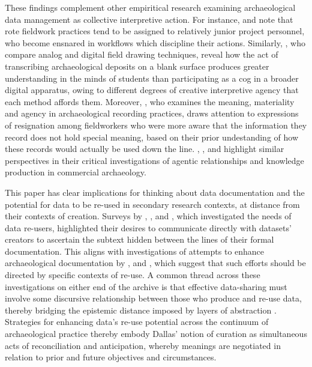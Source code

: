 \documentclass[
]{article}
\begin{document}
These findings complement other empiritical research examining
archaeological data management as collective interpretive action. For
instance, \textcite{batist2021} and \textcite{batist-alienation} note
that rote fieldwork practices tend to be assigned to relatively junior
project personnel, who become ensnared in workflows which discipline
their actions. Similarly, \textcite{morgan2018}, who compare analog and
digital field drawing techniques, reveal how the act of transcribing
archaeological deposits on a blank surface produces greater
understanding in the minds of students than participating as a cog in a
broader digital apparatus, owing to different degrees of creative
interpretive agency that each method affords them. Moreover,
\textcite{yarrow2008}, who examines the meaning, materiality and agency
in archaeological recording practices, draws attention to expressions of
resignation among fieldworkers who were more aware that the information
they record does not hold special meaning, based on their prior
undestanding of how these records would actually be used down the line.
\textcite{thorpe2012}, \textcite{zorzin2010}, \textcite{edgeworth1991}
and \textcite{watson2019} highlight similar perspectives in their
critical investigations of agentic relationships and knowledge
production in commercial archaeology.

This paper has clear implications for thinking about data documentation
and the potential for data to be re-used in secondary research contexts,
at distance from their contexts of creation. Surveys by
\textcite[299-301]{faniel2012}, \textcite[676-677]{atici2013},
\textcite[90-91]{kansa2013} and \textcite[213]{chapman2016}, which
investigated the needs of data re-users, highlighted their desires to
communicate directly with datasets' creators to ascertain the subtext
hidden between the lines of their formal documentation. This aligns with
investigations of attempts to enhance archaeological documentation by
\textcite{huvila2022b}, \textcite{austin2024} and \textcite{opitz2021},
which suggest that such efforts should be directed by specific contexts
of re-use. A common thread across these investigations on either end of
the archive is that effective data-sharing must involve some discursive
relationship between those who produce and re-use data, thereby bridging
the epistemic distance imposed by layers of abstraction
\autocite{huggett2022a}. Strategies for enhancing data's re-use
potential across the continuum of archaeological practice thereby embody
Dallas' \autocite*{dallas2015} notion of curation as simultaneous acts
of reconciliation and anticipation, whereby meanings are negotiated in
relation to prior and future objectives and circumstances.
\end{document}
